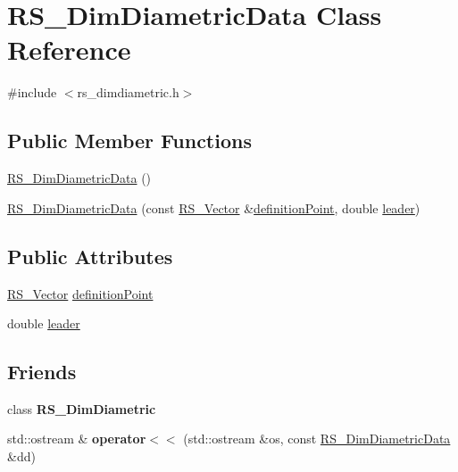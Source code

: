 \hypertarget{classRS__DimDiametricData}{\section{R\-S\-\_\-\-Dim\-Diametric\-Data Class Reference}
\label{classRS__DimDiametricData}
}


{\ttfamily \#include $<$rs\-\_\-dimdiametric.\-h$>$}

\subsection*{Public Member Functions}
\begin{DoxyCompactItemize}
\item 
\hyperlink{classRS__DimDiametricData_a270f099133b1789d9128c8ec6157c591}{R\-S\-\_\-\-Dim\-Diametric\-Data} ()
\item 
\hyperlink{classRS__DimDiametricData_a6940e2534bc45f64cadfb9d82a3e9a1c}{R\-S\-\_\-\-Dim\-Diametric\-Data} (const \hyperlink{classRS__Vector}{R\-S\-\_\-\-Vector} \&\hyperlink{classRS__DimDiametricData_a1e8fe38b2cd3d9fb842cf0d5c4f7a579}{definition\-Point}, double \hyperlink{classRS__DimDiametricData_a38b4fe578738e8127ec5c49dc1def401}{leader})
\end{DoxyCompactItemize}
\subsection*{Public Attributes}
\begin{DoxyCompactItemize}
\item 
\hyperlink{classRS__Vector}{R\-S\-\_\-\-Vector} \hyperlink{classRS__DimDiametricData_a1e8fe38b2cd3d9fb842cf0d5c4f7a579}{definition\-Point}
\item 
double \hyperlink{classRS__DimDiametricData_a38b4fe578738e8127ec5c49dc1def401}{leader}
\end{DoxyCompactItemize}
\subsection*{Friends}
\begin{DoxyCompactItemize}
\item 
\hypertarget{classRS__DimDiametricData_a61a2029866dae0495b5d9f149738009e}{class {\bfseries R\-S\-\_\-\-Dim\-Diametric}}\label{classRS__DimDiametricData_a61a2029866dae0495b5d9f149738009e}

\item 
\hypertarget{classRS__DimDiametricData_aa718483a0e5b151f54dd8f9365904cc1}{std\-::ostream \& {\bfseries operator$<$$<$} (std\-::ostream \&os, const \hyperlink{classRS__DimDiametricData}{R\-S\-\_\-\-Dim\-Diametric\-Data} \&dd)}\label{classRS__DimDiametricData_aa718483a0e5b151f54dd8f9365904cc1}

\end{DoxyCompactItemize}


